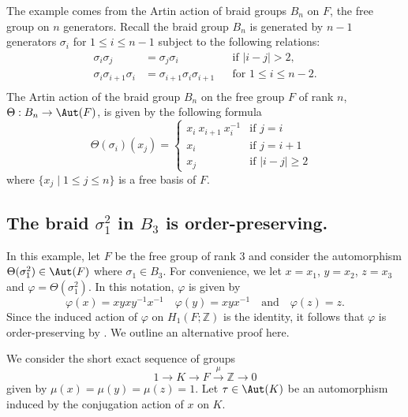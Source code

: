 \documentclass{amsart}
\begin{document}
The example comes from the Artin action of braid groups $B_n$ on $F$, the free group on $n$ generators. Recall the braid group $B_n$ is generated by $n-1$ generators $\sigma_i$ for $1\leq i \leq n-1$ subject to the following relations:
\begin{equation}
\label{eq:BraidRelations}
\begin{aligned}
    \sigma_i \sigma_j &= \sigma_j \sigma_i && \text{if } |i-j|>2, \\
    \sigma_i \sigma_{i+1} \sigma_i &= \sigma_{i+1}\sigma_i\sigma_{i+1} && \text{for } 1 \leq i \leq n-2. \\
\end{aligned}    
\end{equation}
The Artin action of the braid group $B_n$ on the free group $F$ of rank $n$, $\Theta:B_n \to \Aut(F)$, is given by the following formula
\begin{equation}
\label{eq:ArtinAction}
    \Theta(\sigma_i)(x_j)= 
    \begin{cases}
        x_i \ x_{i+1} \ x_i^{-1} & \text{if $j=i$} \\
        x_i & \text{if $j=i+1$} \\
        x_j & \text{if $|i-j| \geq 2$ } 
    \end{cases}
\end{equation}
where $\{x_j \mid 1 \leq j \leq n\}$ is a free basis of $F$.


\subsection{The braid $\sigma_1^2$ in $B_3$ is order-preserving.}
In this example, let $F$ be the free group of rank 3 and consider the automorphism $\Theta(\sigma_1^2) \in \Aut(F)$ where $\sigma_1 \in B_3$. For convenience, we let $x = x_1$, $y = x_2$, $z = x_3$ and $\varphi = \Theta(\sigma_1^2)$. In this notation, $\varphi$ is given by
\[
\varphi(x) = xy x y^{-1}x^{-1} \quad \varphi(y) = xyx^{-1} \quad \text{and} \quad \varphi(z)= z . 
\]
Since the induced action of $\varphi$ on $H_1(F;\mathbb{Z})$ is the identity, it follows that $\varphi$ is order-preserving by \cite[Theorem 2.6]{PerronRolfsen03}. We outline an alternative proof here.

We consider the short exact sequence of groups
\begin{equation}
    1 \to K \to F \xrightarrow{\mu} \mathbb{Z} \to 0
\end{equation}
given by $\mu(x) = \mu(y) = \mu(z)= 1$. Let $\tau \in \Aut(K)$ be an automorphism induced by the conjugation action of $x$ on $K$.
\end{document}

